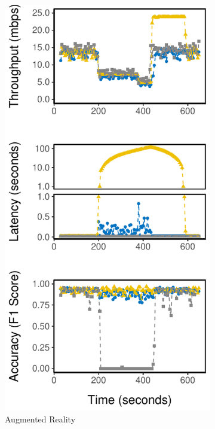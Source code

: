 \begin{figure}[!htb]
\begin{subfigure}[t]{0.3\textwidth}
    \includegraphics[width=\textwidth]{figures/runtime-darknet-verticle.pdf}
    \caption{Augmented Reality}
    \label{fig:ar-runtime}
  \end{subfigure}
  \hfill
  \begin{subfigure}[t]{0.3\textwidth}

\end{subfigure}
\end{figure}
